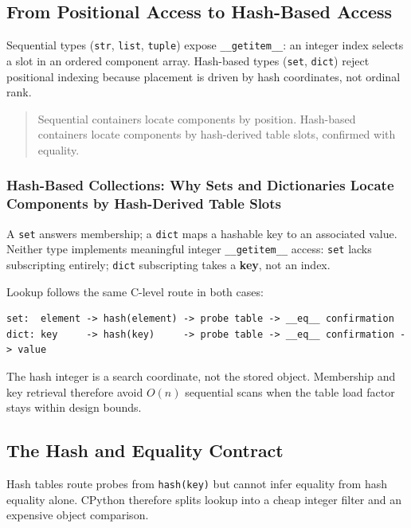 \documentclass[a4paper,twoside]{report}
\begin{document}
\subsection{From Positional Access to Hash-Based Access}

Sequential types (\texttt{str}, \texttt{list}, \texttt{tuple}) expose \texttt{\_\_getitem\_\_}: an integer index selects a slot in an ordered component array. Hash-based types (\texttt{set}, \texttt{dict}) reject positional indexing because placement is driven by hash coordinates, not ordinal rank.

\begin{quote}
Sequential containers locate components by position. Hash-based containers locate components by hash-derived table slots, confirmed with equality.
\end{quote}

\subsubsection{Hash-Based Collections: Why Sets and Dictionaries Locate Components by Hash-Derived Table Slots}

A \texttt{set} answers membership; a \texttt{dict} maps a hashable key to an associated value. Neither type implements meaningful integer \texttt{\_\_getitem\_\_} access: \texttt{set} lacks subscripting entirely; \texttt{dict} subscripting takes a \textbf{key}, not an index.

Lookup follows the same C-level route in both cases:

\begin{verbatim}
set:  element -> hash(element) -> probe table -> __eq__ confirmation
dict: key     -> hash(key)     -> probe table -> __eq__ confirmation -> value
\end{verbatim}

The hash integer is a search coordinate, not the stored object. Membership and key retrieval therefore avoid $O(n)$ sequential scans when the table load factor stays within design bounds.


\subsection{The Hash and Equality Contract}

Hash tables route probes from \texttt{hash(key)} but cannot infer equality from hash equality alone. CPython therefore splits lookup into a cheap integer filter and an expensive object comparison.
\end{document}

